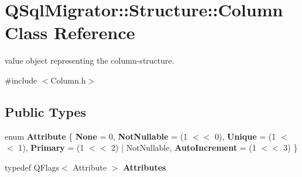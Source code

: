 \hypertarget{class_q_sql_migrator_1_1_structure_1_1_column}{}\section{Q\+Sql\+Migrator\+:\+:Structure\+:\+:Column Class Reference}
\label{class_q_sql_migrator_1_1_structure_1_1_column}


value object representing the column-\/structure.  




{\ttfamily \#include $<$Column.\+h$>$}

\subsection*{Public Types}
\begin{DoxyCompactItemize}
\item 
\mbox{\label{class_q_sql_migrator_1_1_structure_1_1_column_adb71e9396919f3242c34420c64983d29}} 
enum {\bfseries Attribute} \{ \newline
{\bfseries None} = 0, 
{\bfseries Not\+Nullable} = (1 $<$$<$ 0), 
{\bfseries Unique} = (1 $<$$<$ 1), 
{\bfseries Primary} = (1 $<$$<$ 2) $\vert$ Not\+Nullable, 
\newline
{\bfseries Auto\+Increment} = (1 $<$$<$ 3)
 \}
\item 
\mbox{\label{class_q_sql_migrator_1_1_structure_1_1_column_a8b2b73079e271b79bea6aad6ab3a75da}} 
typedef Q\+Flags$<$ Attribute $>$ {\bfseries Attributes}
\end{DoxyCompactItemize}
